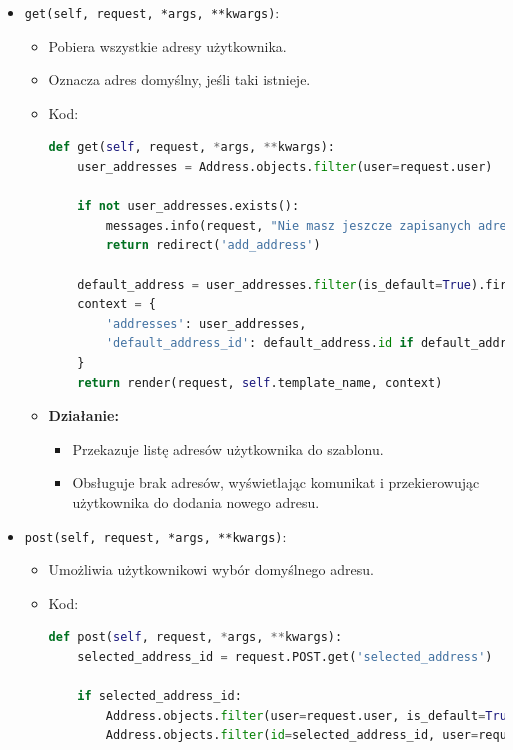 \documentclass[12pt,a4paper,oneside]{article}
\theoremstyle{definition}
\numberwithin{equation}{section}
\begin{document}
\begin{itemize}
    \item \texttt{get(self, request, *args, **kwargs)}:
    \begin{itemize}
        \item Pobiera wszystkie adresy użytkownika.
        \item Oznacza adres domyślny, jeśli taki istnieje.
        \item Kod:
        \begin{lstlisting}[language=Python, caption=Metoda \texttt{get} w \texttt{AddressSelectionView}]
def get(self, request, *args, **kwargs):
    user_addresses = Address.objects.filter(user=request.user)

    if not user_addresses.exists():
        messages.info(request, "Nie masz jeszcze zapisanych adresow. Dodaj nowy adres.")
        return redirect('add_address')

    default_address = user_addresses.filter(is_default=True).first()
    context = {
        'addresses': user_addresses,
        'default_address_id': default_address.id if default_address else None,
    }
    return render(request, self.template_name, context)
        \end{lstlisting}
    \item \textbf{Działanie:}
    \begin{itemize}
        \item Przekazuje listę adresów użytkownika do szablonu.
        \item Obsługuje brak adresów, wyświetlając komunikat i przekierowując użytkownika do dodania nowego adresu.
    \end{itemize}
    \end{itemize}
    \item \texttt{post(self, request, *args, **kwargs)}:
    \begin{itemize}
        \item Umożliwia użytkownikowi wybór domyślnego adresu.
        \item Kod:
        \begin{lstlisting}[language=Python, caption=Metoda \texttt{post} w \texttt{AddressSelectionView}]
def post(self, request, *args, **kwargs):
    selected_address_id = request.POST.get('selected_address')

    if selected_address_id:
        Address.objects.filter(user=request.user, is_default=True).update(is_default=False)
        Address.objects.filter(id=selected_address_id, user=request.user).update(is_default=True)


\end{lstlisting}
\end{itemize}
\end{itemize}
\end{document}
